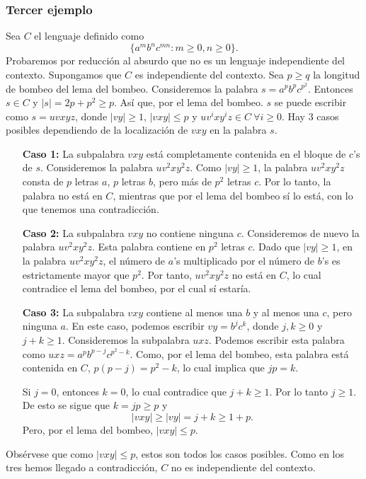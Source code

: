 \documentclass[twoside]{article}
\begin{document}
\subsubsection{Tercer ejemplo}
Sea $C$ el lenguaje definido como 
$$\{a^mb^nc^{mn}:m\geq 0, n\geq 0\}.$$
Probaremos por reducción al absurdo que no es un lenguaje independiente del contexto. Supongamos que $C$ es independiente del contexto. Sea $p\geq q$ la longitud de bombeo del lema del bombeo. Consideremos la palabra $s=a^pb^pc^{p^2}$. Entonces $s\in C$ y $|s|=2p+p^2\geq p$. Así que, por el lema del bombeo. $s$ se puede escribir como $s=uvxyz$, donde $|vy|\geq 1$, $|vxy|\leq p$ y $uv^ixy^iz\in C\ \forall i\geq 0$. Hay 3 casos posibles dependiendo de la localización de $vxy$ en la palabra $s$.
\begin{itemize}
\item[\textbf{Caso 1:}] La subpalabra $vxy$ está completamente contenida en el bloque de $c$'s de $s$. Consideremos la palabra $uv^2xy^2z$. Como $|vy|\geq 1$, la palabra $uv^2xy^2z$ consta de $p$ letras $a$, $p$ letras $b$, pero más de $p^2$ letras $c$. Por lo tanto, la palabra no está en $C$, mientras que por el lema del bombeo sí lo está, con lo que tenemos una contradicción.

\item[\textbf{Caso 2:}] La subpalabra $vxy$ no contiene ninguna $c$. Consideremos de nuevo la palabra $uv^2xy^2z$. Esta palabra contiene en $p^2$ letras $c$. Dado que $|vy|\geq 1$, en la palabra $uv^2xy^2z$, el número de $a$'s multiplicado por el número de $b$'s es estrictamente mayor que $p^2$. Por tanto,  $uv^2xy^2z$ no está en $C$, lo cual contradice el lema del bombeo, por el cual sí estaría.

\item[\textbf{Caso 3:}] La subpalabra $vxy$ contiene al menos una $b$ y al menos una $c$, pero ninguna $a$. En este caso, podemos escribir $vy=b^jc^k$, donde $j,k\geq 0$ y $j+k\geq 1$. Consideremos la subpalabra $uxz$. Podemos escribir esta palabra como $uxz=a^pb^{p-j}c^{p^2-k}$. Como, por el lema del bombeo, esta palabra está contenida en $C$, $p(p-j)=p^2-k$, lo cual implica que $jp=k$. 

Si $j=0$, entonces $k=0$, lo cual contradice que $j+k\geq 1$. Por lo tanto $j\geq 1$. De esto se sigue que $k=jp\geq p$ y 
$$|vxy|\geq |vy|=j+k\geq 1+p.$$
Pero, por el lema del bombeo, $|vxy|\leq p$. 
\end{itemize}
Obsérvese que como $|vxy|\leq p$, estos son todos los casos posibles. Como en los tres hemos llegado a contradicción, $C$ no es independiente del contexto. 
\end{document}
